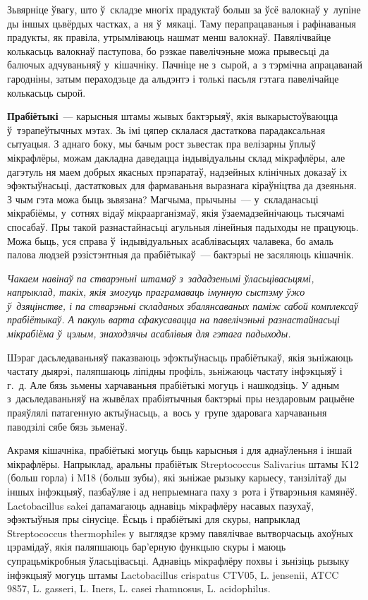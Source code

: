 Зьвярніце ўвагу, што ў~складзе многіх прадуктаў больш за ўсё валокнаў у~лупіне ды іншых цьвёрдых частках, а~ня ў~мякаці. Таму перапрацаваныя і рафінаваныя прадукты, як правіла, утрымліваюць нашмат менш валокнаў. Павялічвайце колькасьць валокнаў паступова, бо рэзкае павелічэньне можа прывесьці да балючых адчуваньняў у~кішачніку. Пачніце не з~сырой, а~з тэрмічна апрацаванай гародніны, затым пераходзьце да альдэнтэ і толькі пасьля гэтага павелічайце колькасьць сырой.

\textbf{Прабіётыкі}~--- карысныя штамы жывых бактэрыяў, якія выкарыстоўваюцца ў~тэрапеўтычных мэтах. Зь імі цяпер склалася дастаткова парадаксальная сытуацыя. З аднаго боку, мы бачым рост зьвестак пра велізарны ўплыў мікрафлёры, можам дакладна даведацца індывідуальны склад мікрафлёры, але дагэтуль ня маем добрых якасных прэпаратаў, надзейных клінічных доказаў іх эфэктыўнасьці, дастатковых для фармаваньня выразнага кіраўніцтва да дзеяньня. З чым гэта можа быць зьвязана? Магчыма, прычыны~--- у~складанасьці мікрабіёмы, у~сотнях відаў мікраарганізмаў, якія ўзаемадзейнічаюць тысячамі спосабаў. Пры такой разнастайнасьці агульныя лінейныя падыходы не працуюць. Можа быць, уся справа ў~індывідуальных асаблівасьцях чалавека, бо амаль палова людзей рэзістэнтныя да прабіётыкаў~--- бактэрыі не засяляюць кішачнік.

\emph{Чакаем навінаў па стварэньні штамаў з~зададзенымі ўласьцівасьцямі, напрыклад, такіх, якія змогуць праграмаваць імунную сыстэму ўжо ў~дзяцінстве, і па стварэньні складаных збалянсаваных паміж сабой комплексаў прабіётыкаў. А пакуль варта сфакусавацца на павелічэньні разнастайнасьці мікрабіёма ў~цэлым, знаходзячы асаблівыя для гэтага падыходы.}

Шэраг дасьледаваньняў паказваюць эфэктыўнасьць прабіётыкаў, якія зьніжаюць частату дыярэі, паляпшаюць ліпідны профіль, зьніжаюць частату інфэкцыяў і г.~д. Але бязь зьмены харчаваньня прабіётыкі могуць і нашкодзіць. У адным з~дасьледаваньняў на жывёлах прабіятычныя бактэрыі пры нездаровым рацыёне праяўлялі патагенную актыўнасьць, а~вось у~групе здаровага харчаваньня паводзілі сябе бязь зьменаў. 


Акрамя кішачніка, прабіётыкі могуць быць карысныя і для аднаўленьня і іншай мікрафлёры. Напрыклад, аральны прабіётык Streptococcus Salivarius штамы K12 (больш горла) і M18 (больш зубы), які зьніжае рызыку карыесу, танзілітаў ды іншых інфэкцыяў, пазбаўляе і ад непрыемнага паху з~рота і ўтварэньня камянёў. Lactobacillus sakei дапамагаюць аднавіць мікрафлёру насавых пазухаў, эфэктыўныя пры сінусіце. Ёсьць і прабіётыкі для скуры, напрыклад Streptococcus thermophiles у~выглядзе крэму павялічвае вытворчасьць ахоўных цэрамідаў, якія паляпшаюць бар'ерную функцыю скуры і маюць супрацьмікробныя ўласьцівасьці. Аднавіць мікрафлёру похвы і зьнізіць рызыку інфэкцыяў могуць штамы Lactobacillus crispatus CTV05, L. jensenii, ATCC 9857, L. gasseri, L. Iners, L. casei rhamnosus, L. acidophilus.

